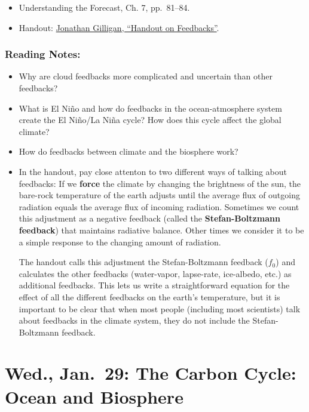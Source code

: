\documentclass[
]{article}
\providecommand{\tightlist}{%
  \setlength{\itemsep}{0pt}\setlength{\parskip}{0pt}}
\begin{document}
\begin{itemize}
\tightlist
\item
  Understanding the Forecast, Ch. 7, pp.~81--84.
\item
  Handout: \href{/files/reading_handouts/Feedback_Handout.pdf}{Jonathan
  Gilligan, ``Handout on Feedbacks''}.
\end{itemize}

\hypertarget{reading-notes-6}{%
\subsubsection{Reading Notes:}\label{reading-notes-6}}

\begin{itemize}
\item
  Why are cloud feedbacks more complicated and uncertain than other
  feedbacks?
\item
  What is El Niño and how do feedbacks in the ocean-atmosphere system
  create the El Niño/La Niña cycle? How does this cycle affect the
  global climate?
\item
  How do feedbacks between climate and the biosphere work?
\item
  In the handout, pay close attenton to two different ways of talking
  about feedbacks: If we \textbf{force} the climate by changing the
  brightness of the sun, the bare-rock temperature of the earth adjusts
  until the average flux of outgoing radiation equals the average flux
  of incoming radiation. Sometimes we count this adjustment as a
  negative feedback (called the \textbf{Stefan-Boltzmann feedback}) that
  maintains radiative balance. Other times we consider it to be a simple
  response to the changing amount of radiation.

  The handout calls this adjustment the Stefan-Boltzmann feedback
  (\(f_0\)) and calculates the other feedbacks (water-vapor, lapse-rate,
  ice-albedo, etc.) as additional feedbacks. This lets us write a
  straightforward equation for the effect of all the different feedbacks
  on the earth's temperature, but it is important to be clear that when
  most people (including most scientists) talk about feedbacks in the
  climate system, they do not include the Stefan-Boltzmann feedback.
\end{itemize}

\hypertarget{wed.-jan.-29-the-carbon-cycle-ocean-and-biosphere}{%
\section{Wed., Jan.~29: The Carbon Cycle: Ocean and
Biosphere}\label{wed.-jan.-29-the-carbon-cycle-ocean-and-biosphere}}
\end{document}
